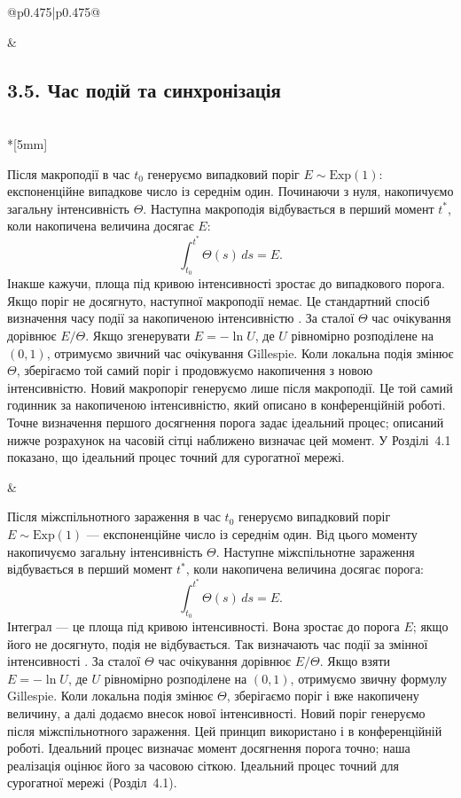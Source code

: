 \documentclass[11pt]{article}
\newcommand{\Exp}{\mathrm{Exp}}
\begin{document}
\begin{longtable}{@{}p{0.475\textwidth}|p{0.475\textwidth}@{}}
\begin{minipage}[t]{\linewidth}
\end{minipage} &
\begin{minipage}[t]{\linewidth}
\subsection*{3.5. Час подій та синхронізація}

\end{minipage} \\*[5mm]
\begin{minipage}[t]{\linewidth}
Після макроподії в час $t_0$ генеруємо випадковий поріг $E\sim\Exp(1)$: експоненційне випадкове число із середнім один. Починаючи з нуля, накопичуємо загальну інтенсивність $\Theta$. Наступна макроподія відбувається в перший момент $t^\ast$, коли накопичена величина досягає $E$:
\begin{equation*}\int_{t_0}^{t^\ast}\Theta(s)\,ds=E.\tag{5}
\end{equation*}
Інакше кажучи, площа під кривою інтенсивності зростає до випадкового порога. Якщо поріг не досягнуто, наступної макроподії немає. Це стандартний спосіб визначення часу події за накопиченою інтенсивністю \citep{ethier1986,anderson2007}. За сталої $\Theta$ час очікування дорівнює $E/\Theta$. Якщо згенерувати $E=-\ln U$, де $U$ рівномірно розподілене на $(0,1)$, отримуємо звичний час очікування Gillespie. Коли локальна подія змінює $\Theta$, зберігаємо той самий поріг і продовжуємо накопичення з новою інтенсивністю. Новий макропоріг генеруємо лише після макроподії. Це той самий годинник за накопиченою інтенсивністю, який описано в конференційній роботі. Точне визначення першого досягнення порога задає ідеальний процес; описаний нижче розрахунок на часовій сітці наближено визначає цей момент. У Розділі~4.1 показано, що ідеальний процес точний для сурогатної мережі.
\end{minipage} &
\begin{minipage}[t]{\linewidth}
Після міжспільнотного зараження в час $t_0$ генеруємо випадковий поріг $E\sim\Exp(1)$ --- експоненційне число із середнім один. Від цього моменту накопичуємо загальну інтенсивність $\Theta$. Наступне міжспільнотне зараження відбувається в перший момент $t^\ast$, коли накопичена величина досягає порога:
\begin{equation*}\int_{t_0}^{t^\ast}\Theta(s)\,ds=E.\tag{5}
\end{equation*}
Інтеграл --- це площа під кривою інтенсивності. Вона зростає до порога $E$; якщо його не досягнуто, подія не відбувається. Так визначають час події за змінної інтенсивності \citep{ethier1986,anderson2007}. За сталої $\Theta$ час очікування дорівнює $E/\Theta$. Якщо взяти $E=-\ln U$, де $U$ рівномірно розподілене на $(0,1)$, отримуємо звичну формулу Gillespie. Коли локальна подія змінює $\Theta$, зберігаємо поріг і вже накопичену величину, а далі додаємо внесок нової інтенсивності. Новий поріг генеруємо після міжспільнотного зараження. Цей принцип використано і в конференційній роботі. Ідеальний процес визначає момент досягнення порога точно; наша реалізація оцінює його за часовою сіткою. Ідеальний процес точний для сурогатної мережі (Розділ~4.1).

\end{minipage}
\end{longtable}
\end{document}
